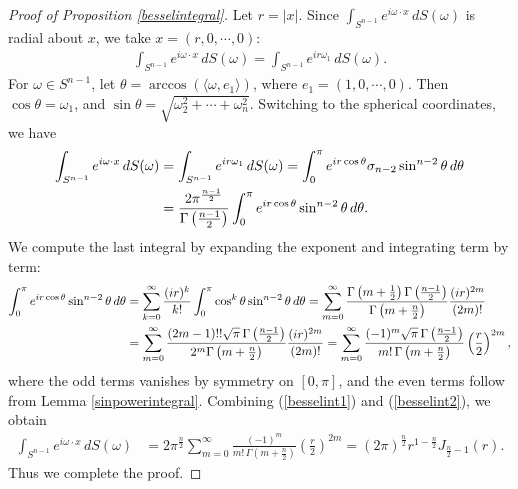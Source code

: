\documentclass{article}
\numberwithin{equation}{section}
\theoremstyle{plain}
\theoremstyle{definition}
\begin{document}
\begin{proof}[Proof of Proposition \ref{besselintegral}]
Let $r=\vert x\vert$. Since $\int_{S^{n-1}}e^{i\omega\cdot x}\,dS(\omega)$ is radial about $x$, we take $x=(r,0,\cdots,0)$:
\begin{align}
	\int_{S^{n-1}}e^{i\omega\cdot x}\,dS(\omega)=\int_{S^{n-1}}e^{ir\omega_1}\,dS(\omega).
\end{align}
For $\omega\in S^{n-1}$, let $\theta=\arccos(\langle\omega,e_1\rangle)$, where $e_1=(1,0,\cdots,0)$. Then $\cos\theta=\omega_1$, and $\sin\theta=\sqrt{\omega_2^2+\cdots+\omega_n^2}$. Switching to the spherical coordinates, we have
\begin{align}
	\int_{S^{n-1}}e^{i\omega\cdot x}\,dS(\omega)&=\int_{S^{n-1}}e^{ir\omega_1}\,dS(\omega)=\int_0^\pi e^{ir\cos\theta}\sigma_{n-2}\sin^{n-2}\theta \,d\theta\notag\\
	&=\frac{2\pi^{\frac{n-1}{2}}}{\Gamma\left(\frac{n-1}{2}\right)}\int_0^\pi e^{ir\cos\theta}\sin^{n-2}\theta \,d\theta.\label{besselint1}
\end{align}
We compute the last integral by expanding the exponent and integrating term by term:
\begin{align}
	\int_0^\pi e^{ir\cos\theta}\sin^{n-2}\theta \,d\theta&=\sum_{k=0}^\infty\frac{(ir)^k}{k!}\int_0^\pi \cos^k\theta\sin^{n-2}\theta\,d\theta=\sum_{m=0}^\infty\frac{\Gamma\left(m+\frac{1}{2}\right)\Gamma\left(\frac{n-1}{2}\right)}{\Gamma\left(m+\frac{n}{2}\right)}\frac{(ir)^{2m}}{(2m)!}\notag\\
	&=\sum_{m=0}^\infty\frac{(2m-1)!!\sqrt{\pi}\,\Gamma\left(\frac{n-1}{2}\right)}{2^m\Gamma\left(m+\frac{n}{2}\right)}\frac{(ir)^{2m}}{(2m)!}=\sum_{m=0}^\infty\frac{(-1)^m \sqrt{\pi}\,\Gamma\left(\frac{n-1}{2}\right)}{m!\,\Gamma\left(m+\frac{n}{2}\right)}\left(\frac{r}{2}\right)^{2m}\label{besselint2},
\end{align}
where the odd terms vanishes by symmetry on $[0,\pi]$, and the even terms follow from Lemma \ref{sinpowerintegral}. Combining (\ref{besselint1}) and (\ref{besselint2}), we obtain
\begin{align*}
	\int_{S^{n-1}}e^{i\omega\cdot x}\,dS(\omega)&=2\pi^{\frac{n}{2}}\sum_{m=0}^\infty\frac{(-1)^m}{m!\,\Gamma\left(m+\frac{n}{2}\right)}\left(\frac{r}{2}\right)^{2m}=(2\pi)^{\frac{n}{2}}r^{1-\frac{n}{2}}J_{\frac{n}{2}-1}(r).
\end{align*}
Thus we complete the proof.
\end{proof}
\end{document}

